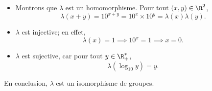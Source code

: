 \begin{itemize}
  \item
    Montrons que $\lambda$ est un homomorphisme. Pour tout $(x,y)\in\R^2$,
    \[
      \lambda(x+y) = 10^{x+y} = 10^x\times 10^y = \lambda(x) \lambda(y).
    \]

  \item
    $\lambda$ est injective; en effet,
    \[
      \lambda(x) = 1 \implies 10^x = 1 \implies x = 0.
    \]

  \item
    $\lambda$ est sujective, car pour tout $y\in\R_+^*$, 
    \[
      \lambda(\log_{10}y) = y.
    \]
\end{itemize}

En conclusion, $\lambda$ est un isomorphisme de groupes.
